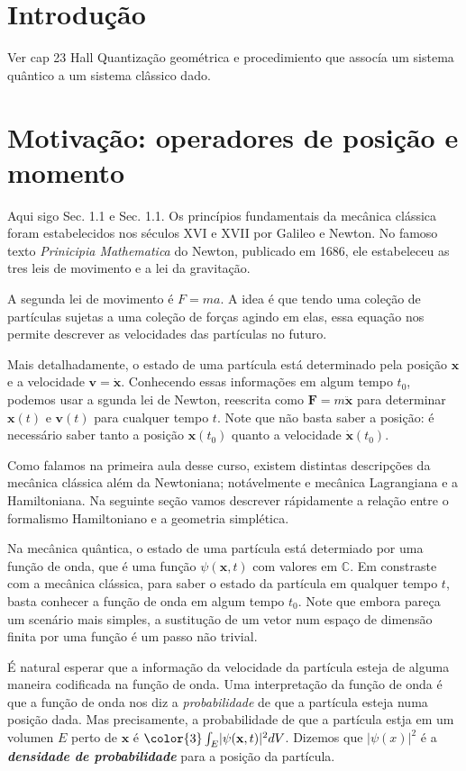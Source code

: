 \tableofcontents

\section{Introdução}
Ver cap 23 Hall
Quantização geométrica e procedimiento que assocía um sistema quântico a um sistema clâssico dado. 

\section{Motivação: operadores de posição e momento}

Aqui sigo \cite{clas} Sec. 1.1 e \cite{qm} Sec. 1.1. Os princípios fundamentais da mecânica clássica foram estabelecidos nos séculos XVI e XVII por Galileo e Newton. No famoso texto \textit{Prinicipia Mathematica} do Newton, publicado em 1686, ele estabeleceu as tres leis de movimento e a lei da gravitação.

A segunda lei de movimento é $F=ma$. A idea  é que tendo uma coleção de partículas sujetas a uma  coleção de forças agindo em elas, essa equação nos permite descrever as velocidades das partículas no futuro.

Mais detalhadamente, o estado de uma partícula está determinado pela posição $\mathbf{x}$ e a velocidade $\mathbf{v}=\dot{\mathbf{x}}$. Conhecendo essas informações em algum tempo $t_0$, podemos usar a sgunda lei de Newton, reescrita como $\mathbf{F}=m\ddot{\mathbf{x}}$ para determinar $\mathbf{x}(t)$ e $\mathbf{v}(t)$ para cualquer tempo $t$. Note que não basta saber a posição: é necessário saber tanto a posição $\mathbf{x}(t_0)$ quanto a velocidade $\dot{\mathbf{x}}(t_0)$.

Como falamos na primeira aula desse curso, existem distintas descripções da mecânica clássica além da Newtoniana; notávelmente e mecânica Lagrangiana e a Hamiltoniana. Na seguinte seção vamos descrever rápidamente a relação entre o formalismo Hamiltoniano e a geometria simplética.

Na mecânica quântica, o estado de uma partícula está determiado por uma função de onda, que é uma função $\psi(\mathbf{x},t)$ com valores em $\mathbb{C}$. Em constraste com a mecânica clássica, para saber o estado da partícula em qualquer tempo $t$,  basta conhecer a função de onda em algum tempo $t_0$. Note que embora pareça um scenário mais simples, a sustitução de um vetor num espaço de dimensão finita por uma função é um passo não trivial.

É natural esperar que a informação da velocidade da partícula esteja de alguma maneira codificada na função de onda. Uma interpretação da função de onda é que a função de onda nos diz a \textit{probabilidade} de que a partícula esteja numa posição dada. Mas precisamente, a probabilidade de que a partícula estja em um volumen $E$ perto de  $\mathbf{x}$ é ${\color{3}\int_{E}}|\psi(\mathbf{x},t)|^2dV$. Dizemos que $|\psi(x)|^2$ é a \textit{\textbf{densidade de probabilidade}} para a posição da partícula.

